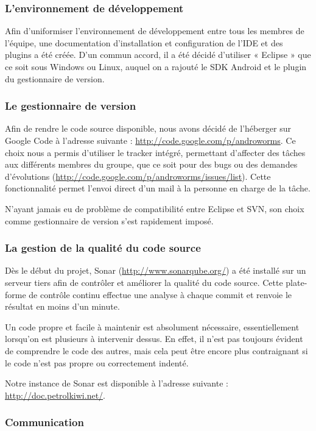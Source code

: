 \documentclass{report}
\begin{document}
\subsubsection{L'environnement de développement}
Afin d’uniformiser l’environnement de développement entre tous les
membres de l’équipe, une documentation d’installation et configuration
de l’IDE et des plugins a été créée.
D’un commun accord, il a été décidé d’utiliser « Eclipse » que ce soit
sous Windows ou Linux, auquel on a rajouté le SDK Android et le plugin
du gestionnaire de version.

\subsubsection{Le gestionnaire de version}

Afin de rendre le code source disponible, nous avons décidé de
l’héberger sur Google Code à l’adresse suivante :
\url{http://code.google.com/p/androworms}.
Ce choix nous a permis d’utiliser le tracker intégré, permettant
d’affecter des tâches aux différents membres du groupe, que ce soit pour
des bugs ou des demandes d’évolutions
(\url{http://code.google.com/p/androworms/issues/list}). Cette
fonctionnalité permet l’envoi direct d’un mail à la personne en charge
de la tâche.

N’ayant jamais eu de problème de compatibilité entre Eclipse et SVN,
son choix comme gestionnaire de version s’est rapidement imposé.

\subsubsection{La gestion de la qualité du code source}

Dès le début du projet, Sonar (\url{http://www.sonarqube.org/}) a été
installé sur un serveur tiers afin de contrôler et améliorer la qualité
du code source.
Cette plate-forme de contrôle continu effectue une analyse à chaque
commit et renvoie le résultat en moins d’un minute.

Un code propre et facile à maintenir est absolument nécessaire,
essentiellement lorsqu’on est plusieurs à intervenir dessus. En effet,
il n’est pas toujours évident de comprendre le code des autres, mais
cela peut être encore plus contraignant si le code n’est pas propre ou
correctement indenté.

Notre instance de Sonar est disponible à l’adresse suivante :
\url{http://doc.petrolkiwi.net/}.

\subsubsection{Communication}
\end{document}
